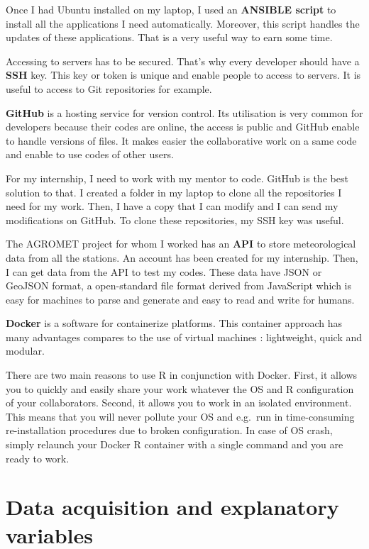 \documentclass[12pt,twoside]{reedthesis}
\theoremstyle{definition}
\theoremstyle{definition}
\theoremstyle{definition}
\theoremstyle{remark}
\begin{document}
Once I had Ubuntu installed on my laptop, I used an \textbf{ANSIBLE
script} to install all the applications I need automatically. Moreover,
this script handles the updates of these applications. That is a very
useful way to earn some time.

Accessing to servers has to be secured. That's why every developer
should have a \textbf{SSH} key. This key or token is unique and enable
people to access to servers. It is useful to access to Git repositories
for example.

\textbf{GitHub} is a hosting service for version control. Its
utilisation is very common for developers because their codes are
online, the access is public and GitHub enable to handle versions of
files. It makes easier the collaborative work on a same code and enable
to use codes of other users.

For my internship, I need to work with my mentor to code. GitHub is the
best solution to that. I created a folder in my laptop to clone all the
repositories I need for my work. Then, I have a copy that I can modify
and I can send my modifications on GitHub. To clone these repositories,
my SSH key was useful.

The AGROMET project for whom I worked has an \textbf{API} to store
meteorological data from all the stations. An account has been created
for my internship. Then, I can get data from the API to test my codes.
These data have JSON or GeoJSON format, a open-standard file format
derived from JavaScript which is easy for machines to parse and generate
and easy to read and write for humans.

\textbf{Docker} is a software for containerize platforms. This container
approach has many advantages compares to the use of virtual machines :
lightweight, quick and modular.

There are two main reasons to use R in conjunction with Docker. First,
it allows you to quickly and easily share your work whatever the OS and
R configuration of your collaborators. Second, it allows you to work in
an isolated environment. This means that you will never pollute your OS
and e.g.~run in time-consuming re-installation procedures due to broken
configuration. In case of OS crash, simply relaunch your Docker R
container with a single command and you are ready to work.

\chapter{Data acquisition and explanatory variables}\label{data-explvar}
\end{document}
